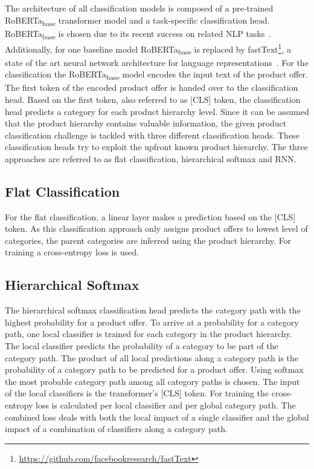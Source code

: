 \documentclass[11pt,dvipdfm]{article}
\begin{document}
The architecture of all classification models is composed of a pre-trained RoBERTa\textsubscript{base} transformer model and a task-specific classification head.
RoBERTa\textsubscript{base} is chosen due to its recent success on related \ac{NLP} tasks~\cite{liu_roberta_2019}. 
Additionally, for one baseline model RoBERTa\textsubscript{base} is replaced by fastText\footnote{\url{https://github.com/facebookresearch/fastText}}, a state of the art neural network architecture for language representations~\cite{joulin_bag_2017}.
For the classification the RoBERTa\textsubscript{base} model encodes the input text of the product offer.
The first token of the encoded product offer is handed over to the classification head.
Based on the first token, also referred to as [CLS] token, the classification head predicts a category for each product hierarchy level.
Since it can be assumed that the product hierarchy contains valuable information, the given product classification challenge is tackled with three different classification heads.
These classification heads try to exploit the upfront known product hierarchy.
The three approaches are referred to as flat classification, hierarchical softmax and \ac{RNN}.

\subsection{Flat Classification}

For the flat classification, a linear layer makes a prediction based on the [CLS] token.
As this classification approach only assigns product offers to lowest level of categories, the parent categories are inferred using the product hierarchy.
For training a cross-entropy loss is used.

\subsection{Hierarchical Softmax}
The hierarchical softmax classification head predicts the category path with the highest probability for a product offer.
To arrive at a probability for a category path, one local classifier is trained for each category in the product hierarchy.
The local classifier predicts the probability of a category to be part of the category path.
The product of all local predictions along a category path is the probability of a category path to be predicted for a product offer.
Using softmax the most probable category path among all category paths is chosen.
The input of the local classifiers is the transformer's [CLS] token.
For training the cross-entropy loss is calculated per local classifier and per global category path.
The combined loss deals with both the local impact of a single classifier and the global impact of a combination of classifiers along a category path.
\end{document}
